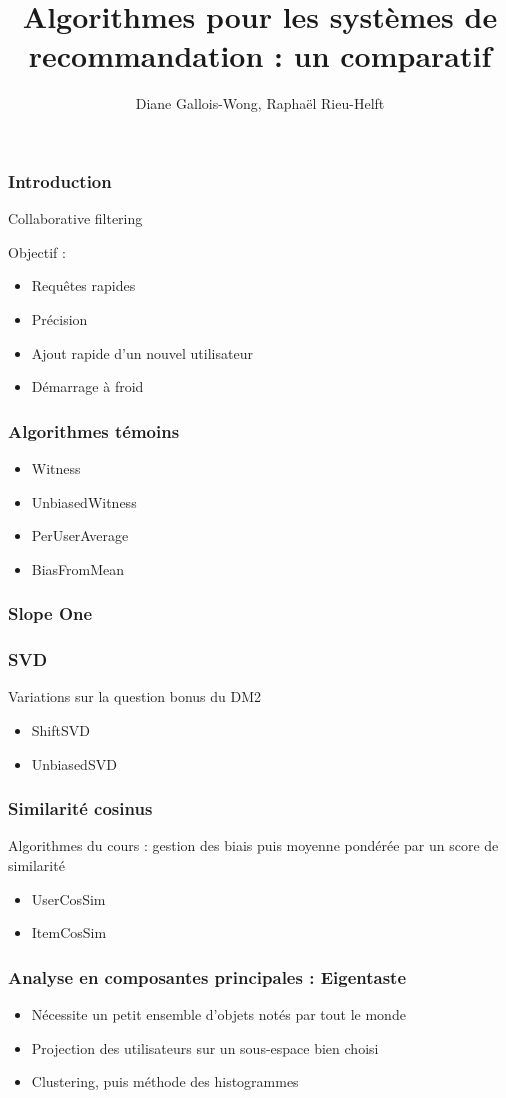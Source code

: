 \documentclass[18pt]{beamer}
\title[Filtrage collaboratif]{Algorithmes pour les systèmes de recommandation : un comparatif}
\author{Diane Gallois-Wong, Raphaël Rieu-Helft}
\begin{document}
	\begin{frame}
		\titlepage
	\end{frame}
	\begin{frame}
		\frametitle{Introduction}
		Collaborative filtering
		
		\bigskip
		
		Objectif : \begin{itemize}
			\item Requêtes rapides
			\item Précision
			\item Ajout rapide d'un nouvel utilisateur
			\item Démarrage à froid
		\end{itemize}
	\end{frame}
	\begin{frame}
		\frametitle{Algorithmes témoins}
		
		\begin{itemize}
			\item Witness
			\item UnbiasedWitness
			\item PerUserAverage
			\item BiasFromMean
		\end{itemize}
	\end{frame}
	\begin{frame}
		\frametitle{Slope One}	
	\end{frame}
	\begin{frame}
		\frametitle{SVD}
		Variations sur la question bonus du DM2
		\begin{itemize}
			\item ShiftSVD
			\item UnbiasedSVD	
		\end{itemize}
	\end{frame}
	\begin{frame}
		\frametitle{Similarité cosinus}
		
		Algorithmes du cours : gestion des biais puis moyenne pondérée par un score de similarité
		\begin{itemize}
			\item UserCosSim
			\item ItemCosSim
		\end{itemize} 
	\end{frame}
	\begin{frame}
		\frametitle{Analyse en composantes principales : Eigentaste}
		
		\begin{itemize}
			\item Nécessite un petit ensemble d'objets notés par tout le monde
			\item Projection des utilisateurs sur un sous-espace bien choisi
			\item Clustering, puis méthode des histogrammes
		\end{itemize}
	\end{frame}
	
\end{document}
